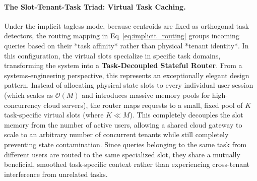 \paragraph{The Slot-Tenant-Task Triad: Virtual Task Caching.}
Under the implicit tagless mode, because centroids are fixed as orthogonal task detectors, the routing mapping in Eq~\ref{eq:implicit_routing} groups incoming queries based on their *task affinity* rather than physical *tenant identity*. In this configuration, the virtual slots specialize in specific task domains, transforming the system into a \textbf{Task-Decoupled Stateful Router}. 
From a systems-engineering perspective, this represents an exceptionally elegant design pattern. Instead of allocating physical state slots to every individual user session (which scales as $\mathcal{O}(M)$ and introduces massive memory pools for high-concurrency cloud servers), the router maps requests to a small, fixed pool of $K$ task-specific virtual slots (where $K \ll M$). This completely decouples the slot memory from the number of active users, allowing a shared cloud gateway to scale to an arbitrary number of concurrent tenants while still completely preventing state contamination. Since queries belonging to the same task from different users are routed to the same specialized slot, they share a mutually beneficial, smoothed task-specific context rather than experiencing cross-tenant interference from unrelated tasks.

